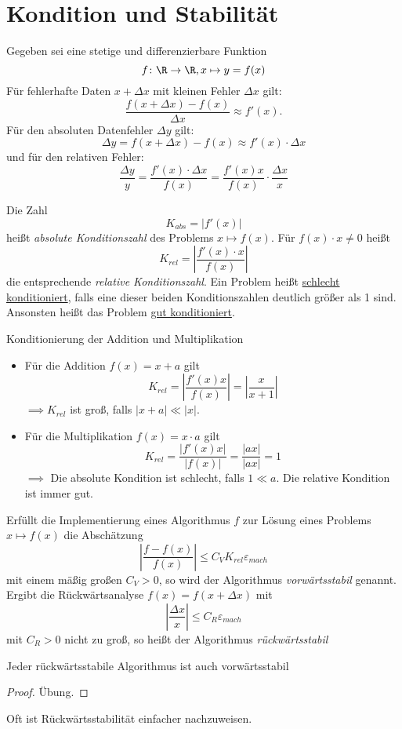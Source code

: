 \section{Kondition und Stabilität}
Gegeben sei eine stetige und differenzierbare Funktion
\[
f \colon \R \to \R, x \mapsto y = f(x) 
\]
Für fehlerhafte Daten $x+\Delta x$ mit kleinen Fehler $\Delta x$ gilt:
\[
\frac{f(x+\Delta x)-f(x)}{\Delta x} \approx f'(x)\text{.}
\]
Für den absoluten Datenfehler $\Delta y$ gilt:
\[
\Delta y= f(x+\Delta x)-f(x) \approx f'(x) \cdot \Delta x
\]
und für den relativen Fehler:
\[
\frac{\Delta y}{y}= \frac{f'(x)\cdot \Delta x}{f(x)}=\frac{f'(x)x}{f(x)}\cdot \frac{\Delta x}{x}
\]
\begin{definition}[Konditionszahlen]
\label{def:konditionszahl}
Die Zahl \[
K_{abs} = |f'(x)|\]
heißt \emph{absolute Konditionszahl} des Problems $x \mapsto f(x)$. 
Für $f(x)\cdot x \neq 0$ heißt
\[
K_{rel}= \left| \frac{f'(x) \cdot x}{f\left( x \right)} \right|\] 
die entsprechende \emph{relative Konditionszahl}.
Ein Problem heißt \underline{schlecht konditioniert}, falls eine dieser beiden Konditionszahlen deutlich größer als 1 sind.
Ansonsten heißt das Problem \underline{gut konditioniert}.
\end{definition}
\begin{example}
Konditionierung der Addition und Multiplikation
\begin{itemize}
	\item Für die Addition $f(x)=x+a$ gilt
\[
K_{rel}= \left|\frac{f'(x)x}{f(x)} \right|= \left|\frac{x}{x+1} \right|
\]
$\implies K_{rel}$ ist groß, falls $|x+a| \ll |x|$.
\item Für die Multiplikation $f(x)=x \cdot a$ gilt
\[
K_{rel} = \frac{|f'(x)x|}{|f(x)|}= \frac{|ax|}{|ax|}=1
\]
$\implies$ Die absolute Kondition ist schlecht, falls $1 \ll a$. Die relative Kondition ist immer gut.
\end{itemize}
\end{example}
\begin{definition}
Erfüllt die Implementierung eines Algorithmus $\boxed{f}$ zur Lösung eines Problems $x \mapsto f(x)$ die Abschätzung
\[
\left|\frac{\boxed{f}-f(x)}{f(x)} \right| \le C_V K_{rel} \varepsilon_{mach}
\]
mit einem mäßig großen $C_V >0$, so wird der Algorithmus \emph{vorwärtsstabil} genannt.
Ergibt die Rückwärtsanalyse $\boxed{f}(x)=f(x+\Delta x)$ mit
\[
\left|\frac{\Delta x}{x} \right| \le C_R \varepsilon_{mach}
\]
mit $C_R>0$ nicht zu groß, so heißt der Algorithmus  \emph{rückwärtsstabil}

\end{definition}
\begin{theorem}
Jeder rückwärtsstabile Algorithmus ist auch vorwärtsstabil
\end{theorem}
\begin{proof}
Übung.
\end{proof}
Oft ist Rückwärtsstabilität einfacher nachzuweisen.
